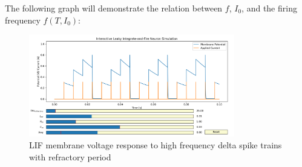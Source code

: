 The following graph will demonstrate the relation between \(f\), \(I_0\), and the firing frequency \(f(T, I_0)\):

\begin{figure}[H]
    \centering
    \includegraphics[width=0.8\textwidth]{methods/computational-models/graphs/LIF-high-freq-spike-response-ref-final.png}
    \caption{LIF membrane voltage response to high frequency delta spike trains with refractory period}
    \label{fig:LIF-high-freq-spike-ref-final}
\end{figure}
